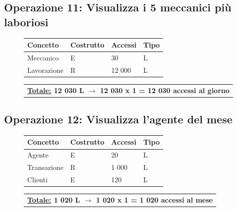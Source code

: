 \documentclass[a4paper,12pt]{report}
\begin{document}
\subsection*{Operazione 11: Visualizza i 5 meccanici più laboriosi}
\begin{figure}[H]
	\centering
	\begin{tabular}{L{4.5cm}C{2cm}C{4.5cm}C{2cm}}
		\rule[-2mm]{0mm}{0.6cm}{}
		\textbf{Concetto} & \textbf{Costrutto} &\textbf{Accessi} & \textbf{Tipo} \\
		\hline\rule[-2mm]{0mm}{0.65cm}{}
		Meccanico & E & 30 & L \\
		\hline\rule[-2mm]{0mm}{0.65cm}{}
		Lavorazione & R & 12 000 & L \\
	\end{tabular}
	
	\begin{tabular}{C{14.3cm}}
		\rule[-3mm]{0mm}{0.85cm}{}	
		 \textbf{\underline{Totale:} 12 030 L $\to$ 12 030 x 1 = 12 030 accessi al giorno}
	\end{tabular}
\end{figure}

\subsection*{Operazione 12: Visualizza l'agente del mese}
\begin{figure}[H]
	\centering
	\begin{tabular}{L{4.5cm}C{2cm}C{4.5cm}C{2cm}}
		\rule[-2mm]{0mm}{0.6cm}{}
		\textbf{Concetto} & \textbf{Costrutto} &\textbf{Accessi} & \textbf{Tipo} \\
		\hline\rule[-2mm]{0mm}{0.65cm}{}
		Agente & E & 20 & L \\
		\hline\rule[-2mm]{0mm}{0.65cm}{}
		Transazione & R & 1 000 & L \\
		\hline\rule[-2mm]{0mm}{0.65cm}{}
		Clienti & E & 120 & L \\
	\end{tabular}
	
	\begin{tabular}{C{14.3cm}}
		\rule[-3mm]{0mm}{0.85cm}{}	
		 \textbf{\underline{Totale:} 1 020 L $\to$ 1 020 x 1 = 1 020 accessi al mese}
	\end{tabular}
\end{figure}
\end{document}
